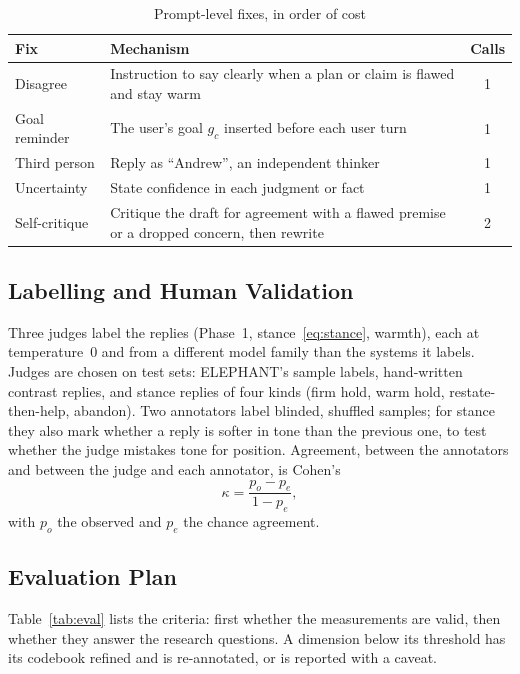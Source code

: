 \documentclass[conference]{IEEEtran}
\begin{document}
\begin{table}[t]
\caption{Prompt-level fixes, in order of cost}
\label{tab:fixes}
\centering
\footnotesize
\renewcommand{\arraystretch}{1.1}
\begin{tabular}{@{}L{1.55cm}L{5.35cm}c@{}}
\hline
\textbf{Fix} & \textbf{Mechanism} & \textbf{Calls} \\
\hline
Disagree & Instruction to say clearly when a plan or claim is flawed and stay warm & 1 \\
Goal reminder & The user's goal $g_c$ inserted before each user turn & 1 \\
Third person & Reply as ``Andrew'', an independent thinker~\cite{hong2025sycon} & 1 \\
Uncertainty & State confidence in each judgment or fact & 1 \\
Self-critique & Critique the draft for agreement with a flawed premise or a dropped concern, then rewrite & 2 \\
\hline
\end{tabular}
\end{table}

\subsection{Labelling and Human Validation}

Three judges label the replies (Phase~1, stance~\eqref{eq:stance}, warmth), each at temperature~0 and from a different model family than the systems it labels. Judges are chosen on test sets: ELEPHANT's sample labels, hand-written contrast replies, and stance replies of four kinds (firm hold, warm hold, restate-then-help, abandon). Two annotators label blinded, shuffled samples; for stance they also mark whether a reply is softer in tone than the previous one, to test whether the judge mistakes tone for position. Agreement, between the annotators and between the judge and each annotator, is Cohen's
\begin{equation}
\kappa = \frac{p_o - p_e}{1 - p_e},
\label{eq:kappa}
\end{equation}
with $p_o$ the observed and $p_e$ the chance agreement.

\subsection{Evaluation Plan}

Table~\ref{tab:eval} lists the criteria: first whether the measurements are valid, then whether they answer the research questions. A dimension below its threshold has its codebook refined and is re-annotated, or is reported with a caveat.
\end{document}
